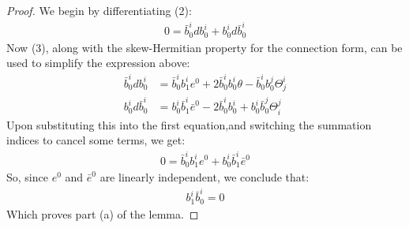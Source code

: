 \begin{proof} We begin by differentiating (2):
%
\begin{align*}
0 = \bar{b}^i_0 d b^i_0 + b^i_0 d \bar{b}^i_0
\end{align*}
%
Now (3), along with the skew-Hermitian property for the connection form, can be used to simplify the expression above:
%
\begin{align*}
\bar{b}^i_0 d b^i_0 &= \bar{b}^i_0 b^i_1 e^0 + 2 \bar{b}^i_0 b^i_0 \theta - \bar{b}^i_0 b^j_0 \Theta^i_j \\
b^i_0 d \bar{b}^i_0 &= b^i_0 \bar{b}^i_1 \bar{e}^0 - 2 \bar{b}^i_0 b^i_0 + b^i_0 \bar{b}^j_0 \Theta^j_i
\end{align*}
%
Upon substituting this into the first equation,and switching the summation indices to cancel some terms, we get:
%
\begin{align*}
0 = \bar{b}^i_0 b^i_1 e^0 + b^i_0 \bar{b}^i_1 \bar{e}^0
\end{align*}
%
So, since $e^0$ and $\bar{e}^0$ are linearly independent, we conclude that:
%
\begin{align}
b^i_1 \bar{b}^i_0 = 0
\end{align}
%
Which proves part (a) of the lemma.


\end{proof}
